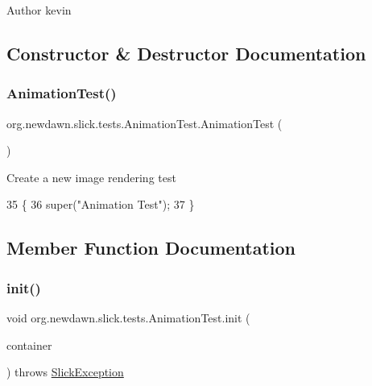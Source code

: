 \begin{DoxyAuthor}{Author}
kevin 
\end{DoxyAuthor}


\subsection{Constructor \& Destructor Documentation}
\mbox{\label{classorg_1_1newdawn_1_1slick_1_1tests_1_1_animation_test_a8cf7ef8e4d51a272a677c3b8a8954f8a}} 
\subsubsection{\texorpdfstring{Animation\+Test()}{AnimationTest()}}
{\footnotesize\ttfamily org.\+newdawn.\+slick.\+tests.\+Animation\+Test.\+Animation\+Test (\begin{DoxyParamCaption}{ }\end{DoxyParamCaption})\hspace{0.3cm}{\ttfamily [inline]}}

Create a new image rendering test 
\begin{DoxyCode}
35                            \{
36         super(\textcolor{stringliteral}{"Animation Test"});
37     \}
\end{DoxyCode}


\subsection{Member Function Documentation}
\mbox{\label{classorg_1_1newdawn_1_1slick_1_1tests_1_1_animation_test_ac9213c0ac4989f2195db9bb9716795de}} 
\subsubsection{\texorpdfstring{init()}{init()}}
{\footnotesize\ttfamily void org.\+newdawn.\+slick.\+tests.\+Animation\+Test.\+init (\begin{DoxyParamCaption}\item[{\mbox{\hyperlink{classorg_1_1newdawn_1_1slick_1_1_game_container}{Game\+Container}}}]{container }\end{DoxyParamCaption}) throws \mbox{\hyperlink{classorg_1_1newdawn_1_1slick_1_1_slick_exception}{Slick\+Exception}}\hspace{0.3cm}{\ttfamily [inline]}}

